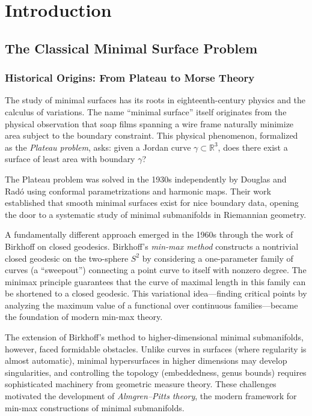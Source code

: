 \chapter{Introduction}
\label{ch:intro}

\section{The Classical Minimal Surface Problem}

\subsection{Historical Origins: From Plateau to Morse Theory}

The study of minimal surfaces has its roots in eighteenth-century physics and the calculus of
variations. The name ``minimal surface'' itself originates from the physical observation that soap
films spanning a wire frame naturally minimize area subject to the boundary constraint. This
physical phenomenon, formalized as the \emph{Plateau problem}, asks: given a Jordan curve
$\gamma \subset \mathbb{R}^3$, does there exist a surface of least area with boundary $\gamma$?

The Plateau problem was solved in the 1930s independently by Douglas and Rad\'o using conformal
parametrizations and harmonic maps. Their work established that smooth minimal surfaces exist for
nice boundary data, opening the door to a systematic study of minimal submanifolds in Riemannian
geometry.

A fundamentally different approach emerged in the 1960s through the work of Birkhoff on closed
geodesics. Birkhoff's \emph{min-max method} constructs a nontrivial closed geodesic on the
two-sphere $S^2$ by considering a one-parameter family of curves (a ``sweepout'') connecting a
point curve to itself with nonzero degree. The minimax principle guarantees that the curve of
maximal length in this family can be shortened to a closed geodesic. This variational idea---finding
critical points by analyzing the maximum value of a functional over continuous families---became
the foundation of modern min-max theory.

The extension of Birkhoff's method to higher-dimensional minimal submanifolds, however, faced
formidable obstacles. Unlike curves in surfaces (where regularity is almost automatic), minimal
hypersurfaces in higher dimensions may develop singularities, and controlling the topology
(embeddedness, genus bounds) requires sophisticated machinery from geometric measure theory. These
challenges motivated the development of \emph{Almgren--Pitts theory}, the modern framework for
min-max constructions of minimal submanifolds.

